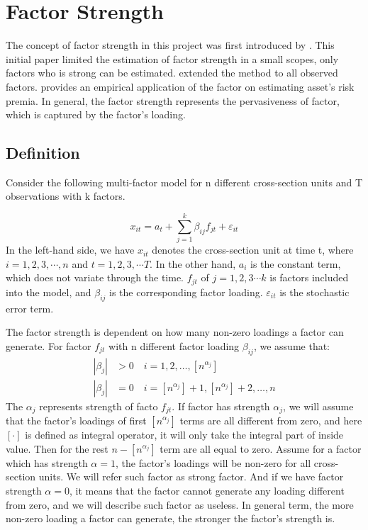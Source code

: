 \documentclass[12pt]{article}
\begin{document}
\section{Factor Strength}\label{strength}
The concept of factor strength in this project was first introduced by . 
This initial paper limited the estimation of factor strength in a small scopes, only factors who is strong can be estimated.
 extended the method to all observed factors. 
 provides an empirical application of the factor on estimating asset's risk premia.
In general, the factor strength represents the pervasiveness of factor, which is captured by the factor's loading.
		\subsection{Definition}\label{definiton}

Consider the following multi-factor model for n different cross-section units and T observations with k  factors.

\[  x_{it} = a_{t}+  \sum_{j=1}^{k}\beta_{ij}f_{jt} + \varepsilon_{it} \tag{1}\label{definition_model} \]
In the left-hand side, we have $x_{it}$ denotes the cross-section unit at time t, where $i = 1, 2,3, \cdots, n$ and $t = 1,2,3, \cdots T$.  
In the other hand, $a_{i}$ is the constant term, which does not variate through the time.
$f_{jt}$ of $j = 1, 2, 3\cdots k$ is factors included into the model, and $\beta_{ij}$ is the corresponding factor loading.
$\varepsilon_{it}$ is the stochastic error term.

The factor strength is dependent on how many non-zero loadings a factor can generate.
For factor $f_{jt}$ with n different factor loading $\beta_{ij}$, we assume that:
\begin{align*}
|\beta_{j}| &> 0\quad i = 1, 2,  \dots, [n^{\alpha_j}]\\
|\beta_{j}| &= 0 \quad i = [n^{\alpha_j}] + 1, [n^{\alpha_j}] +2 ,\dots, n
\end{align*}
The $\alpha_j$ represents strength of facto $f_{jt}$.
If factor has strength $\alpha_j$, we will assume that the factor's loadings of first $[n^{\alpha_j}]$ terms are all different from zero, and here $[\cdot] $  is defined as integral operator, it will only take the integral part of inside value.%
Then for the rest $n - [n^{\alpha_j}]$ term are all equal to zero. %
Assume for a factor which has strength $\alpha = 1$, the factor's loadings will be non-zero for all cross-section units.
We will refer such factor as strong factor.
And if we have factor strength $\alpha = 0$, it means that the factor cannot generate any loading different from zero, and we will describe such factor as useless.
In general term, the more non-zero loading a factor can generate, the stronger the factor's strength is. 
\end{document}
